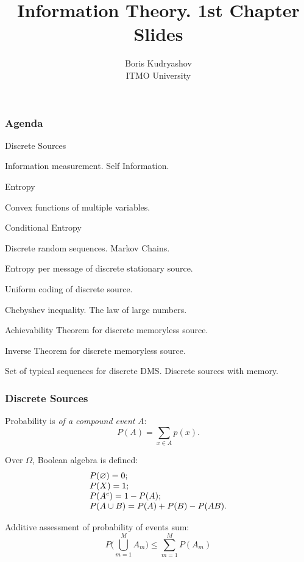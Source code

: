 \documentclass[14pt]{beamer}
\title{\small{Information Theory. 1st Chapter Slides}}
\author{\huge{
Boris Kudryashov \\
\vspace{30pt}
ITMO University
}}
\begin{document}
\maketitle


\begin{frame}
\frametitle{Agenda}
\begin{enumerate}
\footnotesize {

\item Discrete Sources
\item Information measurement. Self Information.
\item Entropy
\item Convex functions of multiple variables.
\item Conditional Entropy
\item Discrete random sequences. Markov Chains.
\item Entropy per message of discrete stationary source.
\item Uniform coding of discrete source.
\item Chebyshev inequality. The law of large numbers.
\item Achievability Theorem for discrete memoryless source.
\item Inverse Theorem for discrete memoryless source.
\item Set of typical sequences for discrete DMS. Discrete sources with memory.
}
\end{enumerate}
\end{frame}

\begin{frame}
\frametitle{Discrete Sources}
\begin{itemize}
\small{

    \item Probability is \textit{of a compound event} $A$:
    \[
    P(A) = \sum\limits_{x \in A} {p(x)} .
    \]
    
    \item Over $\Omega$, Boolean algebra is defined:
    \[
    \begin{tabular}{l}
    $ P(\varnothing) = 0; $ \\
    $ P(X) = 1;         $ \\
    $ P(A^c) = 1 - P(A);$\\
    $ P(A \cup B) = P(A) + P(B) - P(AB).$
    \end{tabular}
    \]

    \item Additive assessment of probability of events sum:
    \[
    P(\bigcup\limits_{m = 1}^M {A_m ) \le \sum\limits_{m = 1}^M {P(A_m )} }
    \]
}
\end{itemize}
\end{frame}
\end{document}
